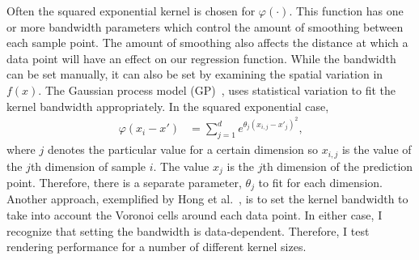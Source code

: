 Often the squared exponential kernel is chosen for $\varphi(\cdot)$. This 
function has one
or more bandwidth parameters which control the amount of smoothing between 
each sample
point. The amount of smoothing also affects the distance at which a data point
will have an effect on our regression function. While the bandwidth can be
set manually, it can also be set by examining the spatial variation in $f(x)$.
The Gaussian process model (GP)~\cite{Rasmussen:2006}, uses statistical 
variation
to fit the kernel bandwidth appropriately. 
In the squared exponential case,
\begin{align}
  \varphi(x_i - x') &= \sum_{j=1}^d e^{\theta_j (x_{i,j} - x'_j)^2}\text{,}
\end{align}
where $j$ denotes the particular value for a certain dimension so $x_{i,j}$ 
is the value of the $j$th dimension of sample $i$. The value $x_j$ is
the $j$th dimension of the prediction point.
Therefore,
there is a separate parameter, $\theta_j$ to fit for each dimension.
Another approach,
exemplified by Hong et al.~\cite{Hong:2006}, is to set the kernel bandwidth to
take into account the Voronoi cells around each data point. In either case,
I recognize that
setting the bandwidth is data-dependent. Therefore, I test rendering performance for a
number of different kernel sizes.

